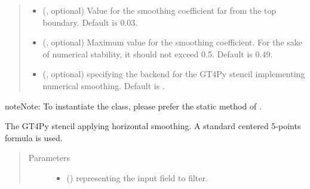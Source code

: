 \documentclass[letterpaper,10pt,english]{sphinxmanual}
\begin{document}
\begin{fulllineitems}
\begin{fulllineitems}
\begin{quote}
\begin{description}
\begin{itemize}
\item {} 
 (, optional) \textendash{} Value for the smoothing coefficient far from the top boundary. Default is 0.03.

\item {} 
 (, optional) \textendash{} Maximum value for the smoothing coefficient. For the sake of numerical stability, it should not
exceed 0.5. Default is 0.49.

\item {} 
 (, optional) \textendash{}  specifying the backend for the GT4Py stencil implementing numerical
smoothing. Default is .

\end{itemize}

\end{description}\end{quote}

\begin{sphinxadmonition}{note}{Note:}
To instantiate the class, please prefer the static method
{\hyperref[\detokenize{api:tasmania.dycore.horizontal_smoothing.HorizontalSmoothing.factory}]{}}
of {\hyperref[\detokenize{api:tasmania.dycore.horizontal_smoothing.HorizontalSmoothing}]{}}.
\end{sphinxadmonition}

\end{fulllineitems}


\begin{fulllineitems}
\label{\detokenize{api:tasmania.dycore.horizontal_smoothing.HorizontalSmoothingSecondOrderYZ._stencil_defs}}
The GT4Py stencil applying horizontal smoothing. A standard centered 5-points formula is used.
\begin{quote}\begin{description}
\item[{Parameters}] \leavevmode\begin{itemize}
\item {} 
 () \textendash{}  representing the input field to filter.


\end{itemize}
\end{description}
\end{quote}
\end{fulllineitems}
\end{fulllineitems}
\end{document}
